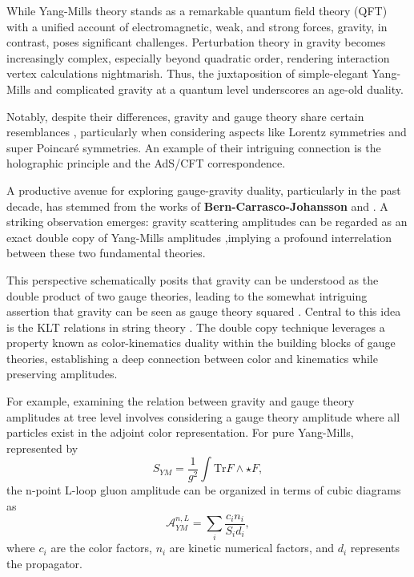 \documentclass[13pt]{article}
\begin{document}
While Yang-Mills theory stands as a remarkable quantum field theory (QFT) with a unified account of electromagnetic, weak, and strong forces, gravity, in contrast, poses significant challenges. Perturbation theory in gravity becomes increasingly complex, especially beyond quadratic order, rendering interaction vertex calculations nightmarish. Thus, the juxtaposition of simple-elegant Yang-Mills and complicated gravity at a quantum level underscores an age-old duality.

Notably, despite their differences, gravity and gauge theory share certain resemblances \cite{Bern2010b,borsten2020gravity}, particularly when considering aspects like Lorentz symmetries and super Poincaré symmetries. An example of their intriguing connection is the holographic principle and the AdS/CFT correspondence.

A productive avenue for exploring gauge-gravity duality, particularly in the past decade, has stemmed from the works of \textbf{Bern-Carrasco-Johansson} \cite{Bern2008,Bern2010b} and \cite{Bern2010}. A striking observation emerges: gravity scattering amplitudes can be regarded as an exact double copy of Yang-Mills amplitudes \cite{Oxburgh_2013,Bern2010b},implying a profound interrelation between these two fundamental theories.

This perspective schematically posits that gravity can be understood as the double product of two gauge theories, leading to the somewhat intriguing assertion that gravity can be seen as gauge theory squared \cite{Bern2010b,wood2021gravity}. Central to this idea is the KLT relations in string theory \cite{Bjerrum_Bohr_2004,ANANTH2007128}. The double copy technique leverages a property known as color-kinematics duality within the building blocks of gauge theories, establishing a deep connection between color and kinematics while preserving amplitudes.

For example, examining the relation between gravity and gauge theory amplitudes at tree level involves considering a gauge theory amplitude where all particles exist in the adjoint color representation. For pure Yang-Mills, represented by
\begin{equation}
S_{YM} = \frac{1}{g^2} \int \text{Tr} F \wedge \star F, \tag{1}
\end{equation}
the n-point L-loop gluon amplitude can be organized in terms of cubic diagrams as
\begin{equation}
\mathcal{A}_{YM}^{n,L} = \sum_i \frac{c_i n_i}{S_i d_i}, \tag{2}
\end{equation}
where $c_i$ are the color factors, $n_i$ are kinetic numerical factors, and $d_i$ represents the propagator.
\end{document}
